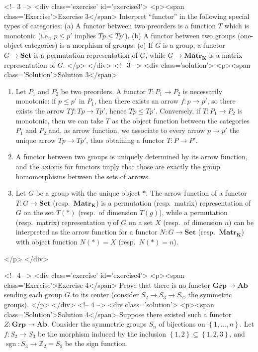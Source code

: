 <!-- 3 -->
<div class='exercise' id='exercise3'>
<p><span class='Exercise'>Exercise 3</span>
Interpret ``functor'' in the following special types of categories: (a) A functor between two preorders is a function $T$ which is monotonic (i.e., $p\leq p'$ implies $Tp\leq Tp'$). (b) A functor between two groups (one-object categories) is a morphism of groups. (c) If $G$ is a group, a functor $G\to\mathbf{Set}$ is a permutation representation of $G$, while $G\to\mathbf{Matr_K}$ is a matrix representation of $G$.
</p>
</div>
<!-- 3 -->
<div class='solution'>
<p><span class='Solution'>Solution 3</span>
\begin{enumerate}
\item[(a)] Let $P_1$ and $P_2$ be two preorders. A functor $T:P_1\to P_2$ is necessarily monotonic: if $p\leq p'$ in $P_1$, then there exists an arrow $f:p\to p'$, so there exists the arrow $Tf:Tp\to Tp'$, hence $Tp\leq Tp'$. Conversely, if $T:P_1\to P_2$ is monotonic, then we can take $T$ as the object function between the categories $P_1$ and $P_2$ and, as arrow function, we associate to every arrow $p\to p'$ the unique arrow $Tp\to Tp'$, thus obtaining a functor $T:P\to P'$.
\item[(b)] A functor between two groups is uniquely determined by its arrow function, and the axioms for functors imply that those are exactly the group homomorphisms between the sets of arrows.
\item[(c)] Let $G$ be a group with the unique object $\ast$. The arrow function of a functor $T:G\to\mathbf{Set}$ (resp.\ $\mathbf{Matr_K}$) is a permutation (resp.\ matrix) representation of $G$ on the set $T(\ast)$ (resp.\ of dimension $T(g)$), while a permutation (resp.\ matrix) representation $\eta$ of $G$ on a set $X$ (resp.\ of dimension $n$) can be interpreted as the arrow function for a functor $N:G\to\mathbf{Set}$ (resp.\ $\mathbf{Matr_K}$) with object function $N(\ast)=X$ (resp.\ $N(\ast)=n$).
\end{enumerate}
</p>
</div>

<!-- 4 -->
<div class='exercise' id='exercise4'>
<p><span class='Exercise'>Exercise 4</span>
Prove that there is no functor $\mathbf{Grp}\to\mathbf{Ab}$ sending each group $G$ to its center (consider $S_2\to S_3\to S_2$, the symmetric groups).
</p>
</div>
<!-- 4 -->
<div class='solution'>
<p><span class='Solution'>Solution 4</span>
Suppose there existed such a functor $Z:\mathbf{Grp}\to\mathbf{Ab}$. Consider the symmetric groups $S_n$ of bijections on $\left\{1,\ldots,n\right\}$. Let $f:S_2\to S_3$ be the morphism induced by the inclusion $\left\{1,2\right\}\subseteq\left\{1,2,3\right\}$, and $\operatorname{sgn}:S_3\to \mathbb{Z}_2=S_2$ be the sign function. 

